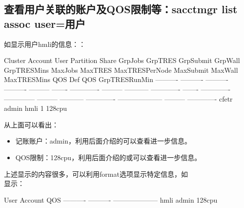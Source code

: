 \subsection{查看用户关联的账户及QOS限制等：sacctmgr list assoc user=用户}
如显示用户hmli的信息：：
\begin{OUT}
   Cluster    Account       User  Partition     Share GrpJobs       GrpTRES GrpSubmit     GrpWall   GrpTRESMins MaxJobs       MaxTRES MaxTRESPerNode MaxSubmit     MaxWall   MaxTRESMins                  QOS   Def QOS GrpTRESRunMin
---------- ---------- ---------- ---------- --------- ------- ------------- --------- ----------- ------------- ------- ------------- -------------- --------- ----------- ------------- -------------------- --------- -------------
     cfetr      admin       hmli                    1                                                                                                                                                  128cpu

\end{OUT}

从上面可以看出：
\begin{itemize}
	\item 记账账户：admin，利用后面介绍的可以查看进一步信息。
	\item QOS限制：128cpu，利用后面介绍的或可以查看进一步信息。
\end{itemize}

上述显示的内容很多，可以利用format选项显示特定信息，如\\显示：
\begin{OUT}
      User    Account                  QOS
---------- ---------- --------------------
      hmli      admin               128cpu
\end{OUT}

